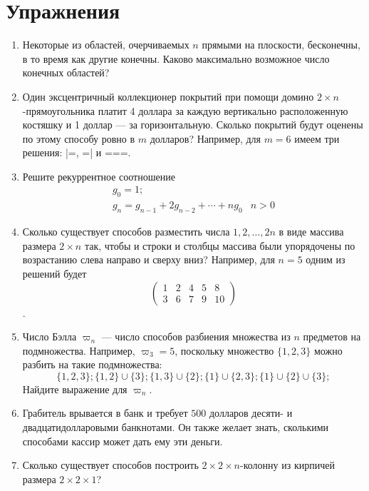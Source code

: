 \documentclass[14pt]{book}
\begin{document}
\chapter{Упражнения}
\begin{enumerate}
\item Некоторые из областей, очерчиваемых $n$ прямыми на плоскости, бесконечны,
в то время как другие конечны. Каково максимально возможное число конечных областей?

\item Один эксцентричный коллекционер покрытий при помощи домино $2 \times n$-прямоугольника
платит 4 доллара за каждую вертикально расположенную костяшку и 1 доллар --- за горизонтальную.
Сколько покрытий будут оценены по этому способу ровно в $m$ долларов? Например, для $m=6$ имеем
три решения: |=, =| и ===.

\item Решите рекуррентное соотношение
$$
\begin{array}{ll}
g_0 = 1; \\
g_n = g_{n-1} + 2g_{n-2} + \cdots + ng_0 & n>0
\end{array}
$$

\item Сколько существует способов разместить числа ${1, 2, \ldots , 2n}$ 
в виде массива размера $2 \times n$ так, чтобы и строки и столбцы массива
были упорядочены по возрастанию слева направо и сверху вниз?
Например, для $n=5$ одним из решений будет 
$$\begin{pmatrix}
1 & 2 & 4 & 5 & 8 \\
3 & 6 & 7 & 9 & 10 
\end{pmatrix}$$.

\item Число Бэлла $\varpi_n$ --- число способов разбиения множества из $n$ предметов на подмножества.
      Например, $\varpi_3=5$, поскольку множество $\{1,2,3\}$ можно разбить на такие подмножества:
      $$\{1,2,3\}; \{1,2\}\cup\{3\}; \{1,3\}\cup\{2\}; \{1\}\cup\{2,3\}; \{1\}\cup\{2\}\cup\{3\}; $$
      Найдите выражение для $\varpi_n$.

\item Грабитель врывается в банк и требует $500$ долларов десяти- и двадцатидолларовыми банкнотами.
      Он также желает знать, сколькими способами кассир может дать ему эти деньги.

\item Сколько существует способов построить $2 \times 2 \times n$-колонну из кирпичей
      размера $2 \times 2 \times 1$?
      

\end{enumerate}
\end{document}
